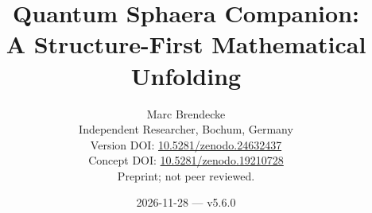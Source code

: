 \newcommand{\workingversion}{5.6.0}
\setcounter{tocdepth}{1}
\title{Quantum Sphaera Companion:\\A Structure-First Mathematical Unfolding}
\author{Marc Brendecke\\
  \small Independent Researcher, Bochum, Germany\\
  \small Version DOI: \href{https://doi.org/10.5281/zenodo.24632437}{10.5281/zenodo.24632437}\\
  \small Concept DOI: \href{https://doi.org/10.5281/zenodo.19210728}{10.5281/zenodo.19210728}\\
  \small Preprint; not peer reviewed.}
\date{2026-11-28 --- v\workingversion}

\newcommand{\qsstatus}[1]{\par\smallskip\noindent\fbox{\parbox{\dimexpr\linewidth-2\fboxsep-2\fboxrule\relax}{\small #1}}\par\smallskip}
\newenvironment{qsarchived}[1]{\par\medskip\noindent\textbf{Archived original of #1.}\par\begin{quote}\small}{\end{quote}\par}
